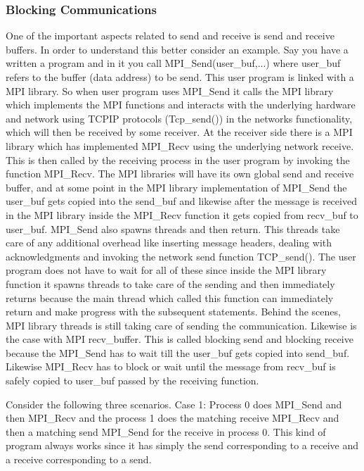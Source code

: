 \documentclass[12pt]{book}
\begin{document}
\subsubsection{Blocking Communications}
One of the important aspects related to send and receive is send and receive buffers. In order to understand this better consider an example. Say you have a written a program and in it you call MPI\_Send(user\_buf,...) where user\_buf refers to the buffer (data address) to be send. This user program is linked with a MPI library. So when user program uses MPI\_Send it calls the MPI library which implements the MPI functions and interacts with the underlying hardware and network using TCPIP protocols (Tcp\_send()) in the networks functionality, which will then be received by some receiver. At the receiver side there is a MPI library which has implemented MPI\_Recv using the underlying network receive. This is then called by the receiving process in the user program by invoking the function MPI\_Recv. The MPI libraries will have its own global send and receive buffer, and at some point in the MPI library implementation of MPI\_Send the user\_buf gets copied into the send\_buf and likewise after the message is received in the MPI library inside the MPI\_Recv function it gets copied from recv\_buf to user\_buf. MPI\_Send also spawns threads and then return. This threads take care of any additional overhead like inserting message headers, dealing with acknowledgments and invoking the network send function TCP\_send(). The user program does not have to wait for all of these since inside the MPI library function it spawns threads to take care of the sending and then immediately returns because the main thread which called this function can immediately return and make progress with the subsequent statements. Behind the scenes, MPI library threads is still taking care of sending the communication. Likewise is the case with MPI recv\_buffer. This is called blocking send and blocking receive because the MPI\_Send has to wait till the user\_buf gets copied into send\_buf. Likewise MPI\_Recv has to block or wait until the message from recv\_buf is safely copied to user\_buf passed by the receiving function.

Consider the following three scenarios.
Case 1: Process 0 does MPI\_Send and then MPI\_Recv and the process 1 does the matching receive MPI\_Recv and then a matching send MPI\_Send for the receive in process 0. This kind of program always works since it has simply the send corresponding to a receive and a receive corresponding to a send. 
\end{document}
